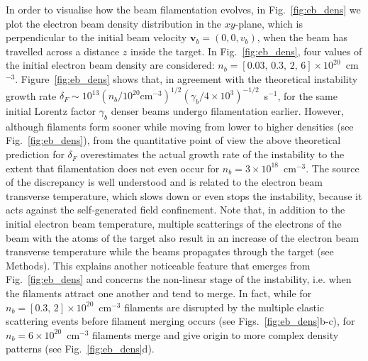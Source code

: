 \documentclass[fleqn,11pt]{wlscirep}
\begin{document}

In order to visualise how the beam filamentation evolves, in Fig.~\ref{fig:eb_dens} we plot the electron beam density distribution in the $xy$-plane, which is perpendicular to the initial beam velocity $\boldsymbol{v}_b=(0,0,v_b)$, when the beam has travelled across a distance $z$ inside the target. In Fig.~\ref{fig:eb_dens}, four values of the initial electron beam density are considered: $n_b=[0.03,\,0.3,\,2,\,6]\times 10^{20}$~cm$^{-3}$. Figure~\ref{fig:eb_dens} shows that, in agreement with the theoretical instability growth rate\cite{MillerChargedBeams} $\delta_F\sim10^{13}(n_b/10^{20}\text{cm}^{-3})^{1/2}(\gamma_b/4\times10^3)^{-1/2}$~s$^{-1}$, 
for the same initial Lorentz factor $\gamma_b$ denser beams undergo filamentation earlier. However, although filaments form sooner while moving from lower to higher densities (see Fig.~\ref{fig:eb_dens}), from the quantitative point of view the above theoretical prediction for $\delta_F$ overestimates the actual growth rate of the instability to the extent that filamentation does not even occur for $n_b=3\times10^{18}$~cm$^{-3}$. 
The source of the discrepancy is well understood and is related to the electron beam transverse temperature, which slows down or even stops the instability\cite{PhysRevE.72.016403}, because it acts against the self-generated field confinement. Note that, in addition to the initial electron beam temperature, multiple scatterings of the electrons of the beam with the atoms of the target also result in an increase of the electron beam transverse temperature while the beams propagates through the target (see Methods). This explains another noticeable feature that emerges from Fig.~\ref{fig:eb_dens} and concerns the non-linear stage of the instability, i.e. when the filaments attract one another and tend to merge. In fact, while for $n_b=[0.3,\,2]\times 10^{20}$~cm$^{-3}$ filaments are disrupted by the multiple elastic scattering events before filament merging occurs (see Figs.~\ref{fig:eb_dens}b-c), for $n_b=6\times 10^{20}$~cm$^{-3}$ filaments merge and give origin to more complex density patterns (see Fig.~\ref{fig:eb_dens}d). 

\end{document}

